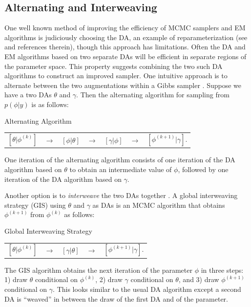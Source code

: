 \documentclass[12pt]{article}
\begin{document}
\subsection{Alternating and Interweaving}
One well known method of improving the efficiency of MCMC samplers and EM algorithms is judiciously choosing the DA, an example of reparameterization (see  \citet{papaspiliopoulos2007general} and references therein), though this approach has limitations. Often the DA and EM algorithms based on two separate DAs will be efficient in separate regions of the parameter space. This property suggests combining the two such DA algorithms to construct an improved sampler. One intuitive approach is to alternate between the two augmentations within a Gibbs sampler \citep{papaspiliopoulos2007general}. Suppose we have a two DAs $\theta$ and $\gamma$. Then the alternating algorithm for sampling from $p(\phi|y)$ is as follows:
\begin{alg*}[Alt]Alternating Algorithm\label{alg:Alt}
{\small \vspace{-.5cm}
  \begin{center}
    \begin{tabular}{lllllll}
  $[\theta|\phi^{(k)}]$& $\to$& $[\phi|\theta]$& $\to$& $[\gamma|\phi]$& $\to$& $[\phi^{(k+1)}|\gamma]$.
    \end{tabular}
  \end{center}
}
\end{alg*}
\noindent One iteration of the alternating algorithm consists of one iteration of the DA algorithm based on $\theta$ to obtain an intermediate value of $\phi$, followed by one iteration of the DA algorithm based on $\gamma$. 

Another option is to {\it interweave} the two DAs together \citep{yu2011center}. A global interweaving strategy (GIS) using $\theta$ and $\gamma$ as DAs is an MCMC algorithm that obtains $\phi^{(k+1)}$ from $\phi^{(k)}$ as follows:
\begin{alg*}[GIS]Global Interweaving Strategy\label{alg:GIS}
{\small \vspace{-.5cm}
\begin{center}
\begin{tabular}{lllll}
    $[\theta|\phi^{(k)}]$ & $\to$& $[\gamma|\theta]$& $\to$& $[\phi^{(k+1)}|\gamma]$.
\end{tabular}
\end{center}
}
\end{alg*}
\noindent The GIS algorithm obtains the next iteration of the parameter $\phi$ in three steps: 1) draw $\theta$ conditional on $\phi^{(k)}$, 2) draw $\gamma$ conditional on $\theta$, and 3) draw $\phi^{(k+1)}$ conditional on $\gamma$. This looks similar to the usual DA algorithm except a second DA is ``weaved'' in between the draw of the first DA and of the parameter. 
\end{document}
